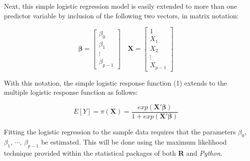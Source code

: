 Next, this simple logistic regression model is easily extended to more than one predictor variable by inclusion of the following two vectors, in matrix notation:

\[
	\boldsymbol{\beta} = 
	\begin{bmatrix}
		\beta_0 \\ \beta_1 \\ \vdots \\ \beta_{p-1}
	\end{bmatrix} \quad
	\textbf{X} = 
	\begin{bmatrix}
		1 \\ X_1 \\ X_2 \\ \vdots \\ X_{p-1}
	\end{bmatrix} 
\]


With this notation, the simple logistic response function (1) extends to the multiple logistic response function as follows:

\begin{equation}
	E[Y] = \pi(\textbf{X}) = \frac{exp(\textbf{X}'\boldsymbol{\beta})}{1+exp(\textbf{X}'\boldsymbol{\beta})}
\end{equation}

Fitting the logistic regression to the sample data requires that the parameters \(\beta_0\), \(\beta_1\), \(\cdots\), \(\beta_{p-1}\) be estimated. This will be done using the maximum likelihood technique provided within the statistical packages of both \textbf{R} and \textit{Python}.


